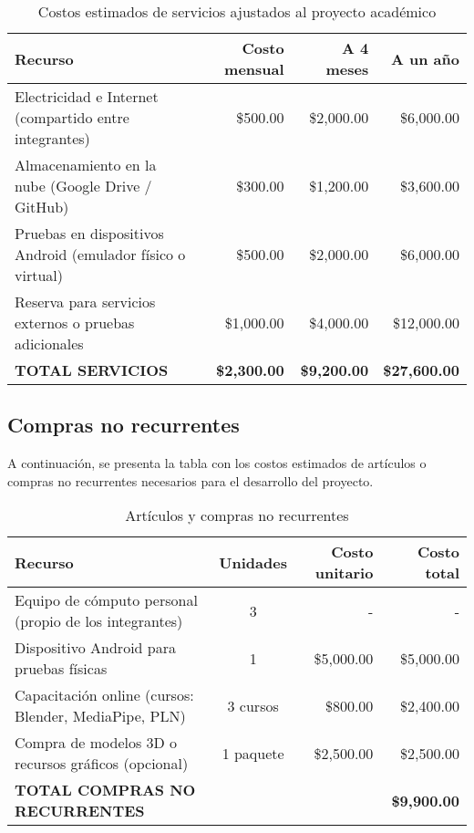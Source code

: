 \begin{table}[h!]
	\centering
	\renewcommand{\arraystretch}{1.5}
	\setlength{\tabcolsep}{10pt}
	\begin{tabular}{|l|r|r|r|}
		\hline
		\textbf{Recurso}                                    & \textbf{Costo mensual} & \textbf{A 4 meses} & \textbf{A un año} \\ \hline
		Electricidad e Internet (compartido entre integrantes)  & \$500.00              & \$2,000.00         & \$6,000.00        \\ \hline
		Almacenamiento en la nube (Google Drive / GitHub)       & \$300.00              & \$1,200.00         & \$3,600.00        \\ \hline
		Pruebas en dispositivos Android (emulador físico o virtual) & \$500.00          & \$2,000.00         & \$6,000.00        \\ \hline
		Reserva para servicios externos o pruebas adicionales    & \$1,000.00            & \$4,000.00         & \$12,000.00       \\ \hline
		\textbf{TOTAL SERVICIOS}                               & \textbf{\$2,300.00}   & \textbf{\$9,200.00} & \textbf{\$27,600.00} \\ \hline
	\end{tabular}
	\caption{Costos estimados de servicios ajustados al proyecto académico}
\end{table}



\subsection{Compras no recurrentes}

A continuación, se presenta la tabla con los costos estimados de artículos o compras no recurrentes necesarios para el desarrollo del proyecto.

\begin{table}[h!]
	\centering
	\renewcommand{\arraystretch}{1.5}
	\setlength{\tabcolsep}{8pt}
	\begin{tabular}{|l|c|r|r|}
		\hline
		\textbf{Recurso}                                    & \textbf{Unidades} & \textbf{Costo unitario} & \textbf{Costo total} \\ \hline
		Equipo de cómputo personal (propio de los integrantes) & 3                & -                      & -                   \\ \hline
		Dispositivo Android para pruebas físicas             & 1                & \$5,000.00             & \$5,000.00          \\ \hline
		Capacitación online (cursos: Blender, MediaPipe, PLN) & 3 cursos        & \$800.00               & \$2,400.00          \\ \hline
		Compra de modelos 3D o recursos gráficos (opcional)   & 1 paquete        & \$2,500.00             & \$2,500.00          \\ \hline
		\textbf{TOTAL COMPRAS NO RECURRENTES}                &                  &                        & \textbf{\$9,900.00} \\ \hline
	\end{tabular}
	\caption{Artículos y compras no recurrentes}
\end{table}

